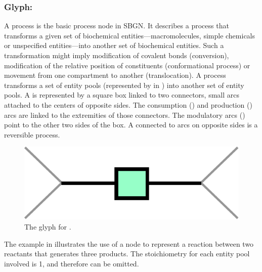 
\subsubsection{Glyph: }
\label{sec:process}

A process is the basic process node in SBGN.  It describes a process that transforms a given set of biochemical entities---macromolecules, simple chemicals or unspecified entities---into another set of biochemical entities.  Such a transformation might imply modification of covalent bonds (conversion), modification of the relative position of constituents (conformational process) or movement from one compartment to another (translocation). A process transforms a set of entity pools (represented by  in \SBGNPDLone) into another set of entity pools. A  is represented by a square box linked to two connectors, small arcs attached to the centers of opposite sides. The consumption () and production () arcs are linked to the extremities of those connectors. The modulatory arcs () point to the other two sides of the box. A  connected to  arcs on opposite sides is a reversible process. 

\begin{figure}[H]
  \centering
  \includegraphics[scale = 0.4]{le_images/process}
  \caption{The \PD glyph for .}
  \label{fig:process}
\end{figure}

The example in  illustrates the use of a  node to represent a reaction between two reactants that generates three products. The stoichiometry for each entity pool involved is 1, and therefore can be omitted.  

